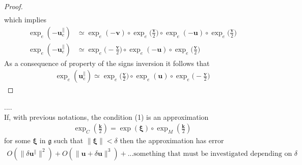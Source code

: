 \begin{proof}
\begin{align*}
	\end{align*}
	which implies
	\begin{align*}
	\exp_{e}(-\mathbf{u}_{e}^{\parallel}) 
	&\simeq
	\exp_{e}(-\mathbf{v}) 
	\circ \exp_{e}\big(\frac{\mathbf{v}}{2}\big)   
	\circ  \exp_{e}(-\mathbf{u}) 
	\circ \exp_{e}\big(\frac{\mathbf{v}}{2}\big)
	\\
	\exp_{e}(-\mathbf{u}_{e}^{\parallel}) 
	&\simeq
	\exp_{e}\big(-\frac{\mathbf{v}}{2}\big)   
	\circ  \exp_{e}(-\mathbf{u}) 
	\circ \exp_{e}\big(\frac{\mathbf{v}}{2}\big)
	\end{align*}
	As a consequence of property of the signs inversion it follows that
	\begin{align*}
	\exp_{e}(\mathbf{u}_{e}^{\parallel}) 
	\simeq
	\exp_{e}\big(\frac{\mathbf{v}}{2}\big)   
	\circ  \exp_{e}(\mathbf{u}) 
	\circ \exp_{e}\big(-\frac{\mathbf{v}}{2}\big)
	\end{align*}
\end{proof} 

\begin{corollary}
	.... \\
	If, with previous notations, the condition (1) is an approximation
	\begin{align*}
	\exp_{C}(\frac{\mathbf{k}}{2}) = \exp(\mathbf{\xi})\circ \exp_{M}(\frac{\mathbf{k}}{2}) 
	\end{align*}
	for some $ \mathbf{\xi}$ in  $\mathfrak{g}$ such that $\parallel\mathbf{\xi} \parallel < \delta$
	then the approximation has error
	\begin{align*}
	O(\parallel \delta\mathbf{u}^{\parallel} \parallel^{2} )  
	+ O(\parallel \mathbf{u} + \delta\mathbf{u}\parallel^{3})
	+ \text{...something that must be investigated depending on } \delta
	\end{align*}
\end{corollary}

